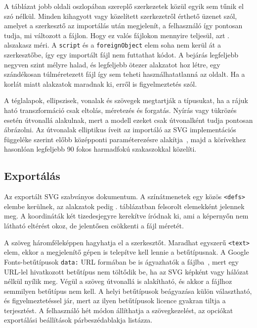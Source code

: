 A táblázat jobb oldali oszlopában szereplő szerkezetek közül egyik sem tűnik el szó nélkül. Minden kihagyott vagy közelített szerkezetről érthető üzenet szól, amelyet a szerkesztő az importálás után megjelenít, a felhasználó így pontosan tudja, mi változott a fájlon. Hogy ez valós fájlokon mennyire teljesül, azt . alszakasz méri. A \texttt{script} és a \texttt{foreignObject} elem soha nem kerül át a szerkesztőbe, így egy importált fájl nem futtathat kódot. A bejárás legfeljebb negyven szint mélyre halad, és legfeljebb ötezer alakzatot hoz létre, egy szándékosan túlméretezett fájl így sem teheti használhatatlanná az oldalt. Ha a korlát miatt alakzatok maradnak ki, erről is figyelmeztetés szól.

A téglalapok, ellipszisek, vonalak és szövegek megtartják a típusukat, ha a rájuk ható transzformáció csak eltolás, méretezés és forgatás. Nyírás vagy tükrözés esetén útvonallá alakulnak, mert a modell ezeket csak útvonalként tudja pontosan ábrázolni. Az útvonalak elliptikus íveit az importáló az SVG implementációs függeléke szerint előbb középponti paraméterezésre alakítja~\cite{w3c-svg-implnote}, majd a körívekhez hasonlóan legfeljebb 90 fokos harmadfokú szakaszokkal közelíti.

\subsection{Exportálás}

Az exportált SVG szabványos dokumentum. A színátmenetek egy közös \texttt{<defs>} elembe kerülnek, az alakzatok pedig . táblázatban felsorolt elemekként jelennek meg. A koordináták két tizedesjegyre kerekítve íródnak ki, ami a képernyőn nem látható eltérést okoz, de jelentősen csökkenti a fájl méretét.

A szöveg háromféleképpen hagyhatja el a szerkesztőt. Maradhat egyszerű \texttt{<text>} elem, ekkor a megjelenítő gépen is telepítve kell lennie a betűtípusnak. A Google Fonts-betűtípusok \texttt{data:} URL formában be is ágyazhatók a fájlba~\cite{mdn-fontface}, mert egy URL-lel hivatkozott betűtípus nem töltődik be, ha az SVG képként vagy hálózat nélkül nyílik meg. Végül a szöveg útvonallá is alakítható, és akkor a fájlhoz semmilyen betűtípus nem kell. A helyi betűtípusok beágyazása külön választható, és figyelmeztetéssel jár, mert az ilyen betűtípusok licence gyakran tiltja a terjesztést. A felhasználó hét módon állíthatja a szövegkezelést, az opciókat  exportálási beállítások párbeszédablakja listázza.


